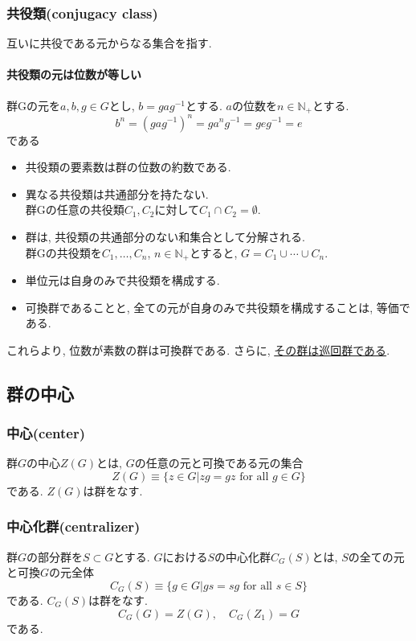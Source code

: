 \documentclass[11pt, a4paper]{jsarticle}
\begin{document}
\subsubsection{共役類(conjugacy class)}
互いに共役である元からなる集合を指す.

\paragraph{共役類の元は位数が等しい}
群Gの元を$a,b,g \in G$とし, $ b = gag^{-1}とする.$
$a$の位数を$n\in\mathbb{N}_+$とする.
\begin{equation}
 b^n = (gag^{-1})^n = ga^{n}g^{-1} = geg^{-1} = e
\end{equation}
である

\begin{itemize}
\item 共役類の要素数は群の位数の約数である.
\item 異なる共役類は共通部分を持たない. \\
群Gの任意の共役類$C_1, C_2$に対して$C_1 \cap C_2 = \emptyset$.
\item 群は, 共役類の共通部分のない和集合として分解される. \\
群Gの共役類を$C_1,\dots,C_n$, $n\in\mathbb{N}_+$とすると, $G = C_1 \cup \cdots \cup C_n$.
\item 単位元は自身のみで共役類を構成する.
\item 可換群であることと, 全ての元が自身のみで共役類を構成することは, 等価である.
\end{itemize}
これらより, 位数が素数の群は可換群である.
さらに, \uline{その群は巡回群である}.

\subsection{群の中心}
\subsubsection{中心(center)}
群$G$の中心$Z(G)$とは, $G$の任意の元と可換である元の集合
\begin{equation}
Z(G) \equiv \{ z \in G | zg = gz \text{ for all } g \in G \}
\end{equation}
である.
$Z(G)$は群をなす.

\subsubsection{中心化群(centralizer)}
群$G$の部分群を$S \subset G$とする.
$G$における$S$の中心化群$C_G(S)$とは, $S$の全ての元と可換$G$の元全体
\begin{equation}
	C_G(S) \equiv \{ g \in G | gs = sg \text{ for all } s \in S \}
\end{equation}
である.
$C_G(S)$は群をなす.
\begin{equation}
	C_G(G) = Z(G),\quad C_G(Z_1) = G
\end{equation}
である.
\end{document}

